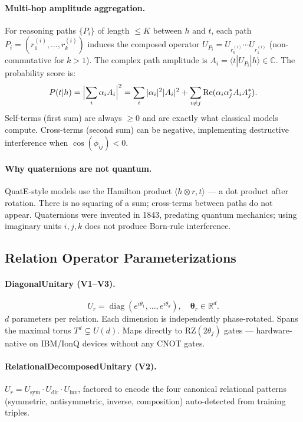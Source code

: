 \documentclass[runningheads]{llncs}
\newcommand{\CC}{\mathbb{C}}
\newcommand{\RR}{\mathbb{R}}
\newcommand{\Ud}{U(d)}
\newcommand{\Td}{T^d}
\newcommand{\braket}[2]{\langle#1|#2\rangle}
\begin{document}
\paragraph{Multi-hop amplitude aggregation.}
For reasoning paths $\{P_i\}$ of length $\leq K$ between $h$ and $t$, each
path $P_i=(r_1^{(i)},\ldots,r_k^{(i)})$ induces the composed operator
$U_{P_i}=U_{r_k^{(i)}}\cdots U_{r_1^{(i)}}$ (non-commutative for $k>1$).
The complex path amplitude is $A_i=\braket{t}{U_{P_i}|h}\in\CC$.  The
probability score is:
\begin{equation}
  P(t|h) = \Bigl|\sum_i \alpha_i A_i\Bigr|^2
  = \sum_i|\alpha_i|^2|A_i|^2
    + \sum_{i\neq j}\operatorname{Re}(\alpha_i\alpha_j^*A_iA_j^*).
  \label{eq:born}
\end{equation}
Self-terms (first sum) are always $\geq 0$ and are exactly what classical
models compute.  Cross-terms (second sum) can be negative, implementing
destructive interference when $\cos(\phi_{ij})<0$.

\paragraph{Why quaternions are not quantum.}
QuatE-style models use the Hamilton product $\langle h\otimes r, t\rangle$
--- a dot product after rotation.  There is no squaring of a sum; cross-terms
between paths do not appear.  Quaternions were invented in 1843, predating
quantum mechanics; using imaginary units $i,j,k$ does not produce Born-rule
interference.

\subsection{Relation Operator Parameterizations}
\label{sec:unitaries}

\paragraph{DiagonalUnitary (V1--V3).}
\[
  U_r=\operatorname{diag}(e^{i\theta_1},\ldots,e^{i\theta_d}),\quad
  \bm\theta_r\in\RR^d.
\]
$d$ parameters per relation.  Each dimension is independently phase-rotated.
Spans the maximal torus $\Td\subsetneq\Ud$.  Maps directly to
$\mathrm{RZ}(2\theta_j)$ gates --- hardware-native on IBM/IonQ devices
without any CNOT gates.

\paragraph{RelationalDecomposedUnitary (V2).}
$U_r=U_\text{sym}\cdot U_\text{dir}\cdot U_\text{inv}$, factored to
encode the four canonical relational patterns (symmetric, antisymmetric,
inverse, composition) auto-detected from training triples.
\end{document}
